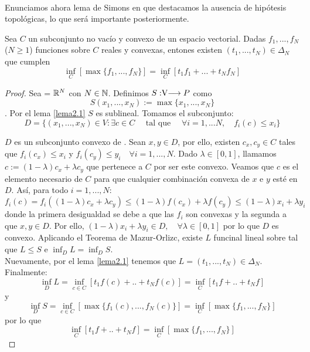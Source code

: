 	\paragraph{} Enunciamos ahora lema de Simons\cite{Simons2008} en que destacamos la ausencia de hipótesis topológicas, lo que será importante posteriormente.
	
	\begin{lemaBox}\label{Simons}
		Sea $ C $ un subconjunto no vacío y convexo de un espacio vectorial. Dadas $ f_1, ..., f_N $ ($ N \geq 1 $)  funciones sobre $ C $ reales y convexas, entones existen $ (t_1, ..., t_N) \in \Delta_N $ que cumplen
		\[
		\inf_C\left[ \max \{f_1, ..., f_N\}\right] = \inf_C \left[ t_1 f_1+ ...+t_N f_N \right]
		\] 
	\end{lemaBox}
	\begin{proof}
		Sea  \vecSpace = $ \mathbb{R}^N $ con $ N \in \mathbb{N} $. Definimos $S:\vecSpace \longrightarrow P $ como \[ S(x_1, ..., x_N) := \max \{x_1, ..., x_N\} \]. Por el lema \ref{lema2.1} $ S $ es sublineal. Tomamos el subconjunto:
		\[ 
		D = \{ (x_1, ..., x_N)\in V: \exists c \in C \quad \text{ tal que } \quad \forall i = 1,...N,\quad f_i(c) \leq x_i \}
		\]
		
		$ D $ es un subconjunto convexo de \vecSpace. Sean $ x, y \in D $, por ello, existen $ c_x, c_y \in C $ tales que $ f_i (c_x) \leq x_i  $ y $ f_i (c_y) \leq y_i \quad \forall i=1,...,N $. Dado $ \lambda \in [0,1] $, llamamos $ c := (1-\lambda)c_x + \lambda c_y $ que pertenece a $ C $ por ser este convexo. Veamos que $ c $ es el elemento necesario de $ C $ para que cualquier combinación convexa de $ x $ e $ y $ esté en $ D $. Así, para todo $ i =1,...,N  $:	
		\[
		f_i(c) = f_i((1-\lambda)c_x + \lambda c_y) \leq (1-\lambda)f(c_x) + \lambda f(c_y) \leq (1-\lambda)x_i + \lambda y_i 
		\]
		donde la primera desigualdad se debe a que las $ f_i $ son convexas y la segunda a que $ x,y \in D $. Por ello, $ (1-\lambda)x_i + \lambda y_i \in D , \quad \forall \lambda \in [0,1] $ por lo que $ D $ es convexo. Aplicando el Teorema de Mazur-Orlizc, existe $ L $ funcinal lineal sobre \vecSpace tal que $ L \leq S $ e $ \inf_D L = \inf_D S $. \\
		
		Nuevamente, por el lema \ref{lema2.1} tenemos que $ L = (t_1,...,t_N) \in \Delta_N$. \\
		
		Finalmente:
		\[
		\inf_D L = \inf_{c\in C} \left[ t_1 f(c) + ..+ t_N f(c) \right] = \inf_{C} \left[ t_1 f + ..+ t_N f \right]
		\]
		y
		\[
		\inf_D S = \inf_{c\in C} \left[ \max \{f_1(c), ..., f_N(c)\} \right] = \inf_C\left[ \max \{f_1, ..., f_N\}\right] 
		\]
		por lo que 
		\[ \inf_{C} \left[ t_1 f + ..+ t_N f \right] = \inf_C\left[ \max \{f_1, ..., f_N\}\right]  \] 
	\end{proof}


